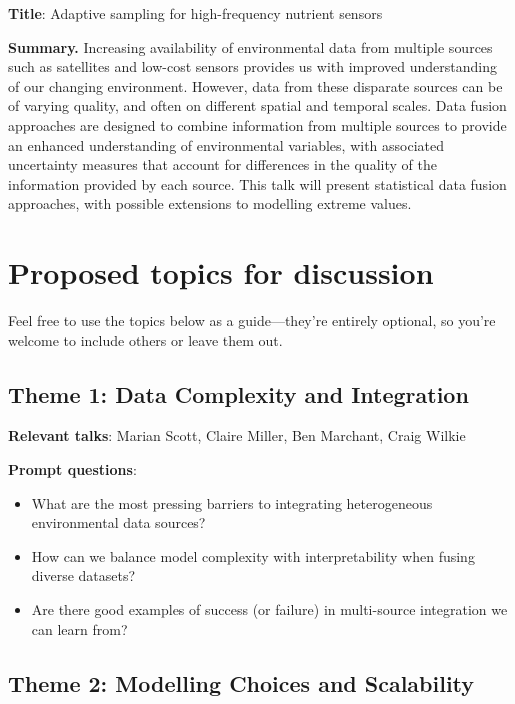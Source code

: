 \documentclass[
  11pt,
  letterpaper,
  DIV=11,
  numbers=noendperiod]{scrartcl}
\begin{document}
\textbf{Title}: Adaptive sampling for high-frequency nutrient sensors

\textbf{Summary.} Increasing availability of environmental data from
multiple sources such as satellites and low-cost sensors provides us
with improved understanding of our changing environment. However, data
from these disparate sources can be of varying quality, and often on
different spatial and temporal scales. Data fusion approaches are
designed to combine information from multiple sources to provide an
enhanced understanding of environmental variables, with associated
uncertainty measures that account for differences in the quality of the
information provided by each source. This talk will present statistical
data fusion approaches, with possible extensions to modelling extreme
values.

\newpage

\section{Proposed topics for
discussion}\label{proposed-topics-for-discussion}

Feel free to use the topics below as a guide---they're entirely
optional, so you're welcome to include others or leave them out.

\subsection{Theme 1: Data Complexity and
Integration}\label{theme-1-data-complexity-and-integration}

\textbf{Relevant talks}: Marian Scott, Claire Miller, Ben Marchant,
Craig Wilkie

\textbf{Prompt questions}:

\begin{itemize}
\item
  What are the most pressing barriers to integrating heterogeneous
  environmental data sources?
\item
  How can we balance model complexity with interpretability when fusing
  diverse datasets?
\item
  Are there good examples of success (or failure) in multi-source
  integration we can learn from?
\end{itemize}

\subsection{Theme 2: Modelling Choices and
Scalability}\label{theme-2-modelling-choices-and-scalability}
\end{document}
